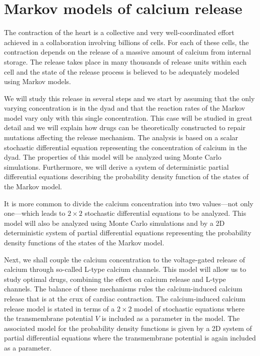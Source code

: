 \section{Markov models of calcium release}
The contraction of the heart is a collective and very well-coordinated effort achieved in a collaboration involving billions of cells. For each of these cells, the contraction depends on the release of a massive amount of calcium from internal storage. The release takes place in many thousands of release units within each cell and the state of the release process is believed to be adequately modeled using Markov models.

We will study this release in several steps and we start by assuming that the only varying concentration is in the dyad and that the reaction rates of the Markov model vary only with this single concentration. This case will be studied in great detail and we will explain how drugs can be theoretically constructed to repair mutations affecting the release mechanism. The analysis is based on a scalar stochastic differential equation representing the concentration of calcium in the dyad. The properties of this model will be analyzed using Monte Carlo simulations. Furthermore, we will derive a system of deterministic partial differential equations describing the probability density function of the states of the Markov model.

It is more common to divide the calcium concentration into two values---not only one---which leads to  $2\times2$ stochastic differential equations to be analyzed. This model will also be analyzed using Monte Carlo simulations and by a 2D deterministic system of partial differential equations representing the probability density functions of the states of the Markov model.

Next, we shall couple the calcium concentration to the voltage-gated release of calcium through so-called L-type calcium channels. This model will allow us to study optimal drugs, combining the effect on calcium release and L-type channels. The balance of these mechanisms rules the calcium-induced calcium release that is at the crux of cardiac contraction. The calcium-induced calcium release model is stated in terms of a $2\times 2$ model of stochastic equations where the transmembrane potential $V$ is included as a parameter in the model. The associated model for the probability density functions is given by a 2D system of partial differential equations where the transmembrane potential is again included as a parameter.

